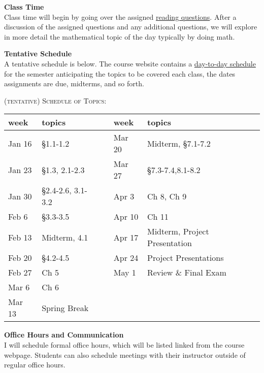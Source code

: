\documentclass[12pt]{article}
\renewcommand{\emph}[1]{\textsf{\textbf{#1}}}
\newcommand{\localhead}[1]{\par\smallskip\textbf{#1}\nobreak\\}%
\def\heading#1{\localhead{\large\emph{#1}}}
\begin{document}
\heading{Class Time}

Class time will begin by going over the assigned \href{https://jrfaudree.github.io/HOM2023/rq.html}{reading questions}. After a discussion of the assigned questions and any additional questions, we will explore in more detail the mathematical topic of the day typically by doing math.


\heading{Tentative Schedule}
A tentative schedule is below. The course website contains a \href{https://docs.google.com/spreadsheets/d/e/2PACX-1vRljb1-0lJ9CtIRxdMsZyeBSeQeEZfkl7WBYEpcGmgYnoMynhaaJGCkPKR3t-NxstMAChrq4HY-ms9D/pubhtml?gid=0&single=true}{day-to-day schedule} for the semester anticipating
the topics to be covered each class, the dates assignments are due,
midterms, and so forth. 

\textsc{(tentative) Schedule of Topics:}

\begin{tabular}{|l|l|l|l|l|}
  \hline
  week & topics &  & week & topics \\
  \hline
  Jan 16 & \S 1.1-1.2 &  & Mar 20 & Midterm, \S 7.1-7.2\\

\hline
  Jan 23 & \S 1.3, 2.1-2.3 &  & Mar 27 & \S 7.3-7.4,8.1-8.2\\

\hline
  Jan 30 & \S 2.4-2.6, 3.1-3.2 &  & Apr 3 & Ch 8, Ch 9\\

\hline
  Feb 6 &   \S 3.3-3.5  &  & Apr 10 & Ch 11 \\

\hline
  Feb 13 & Midterm, 4.1 &  & Apr 17 &Midterm, Project Presentation \\

\hline
  Feb 20 & \S 4.2-4.5&  & Apr 24 &  Project Presentations \\
\hline
  Feb 27 & Ch 5&  & May 1  & Review \& Final Exam\\
  
\hline
  Mar 6  & Ch 6&  & &  \\

\hline
  Mar 13 & Spring Break        & & & \\
  \hline
\end{tabular}



\heading{Office Hours and Communication}
I will schedule formal office hours,
which will be listed linked from the course webpage. Students can also schedule meetings with their instructor outside of regular office hours. 
\end{document}
